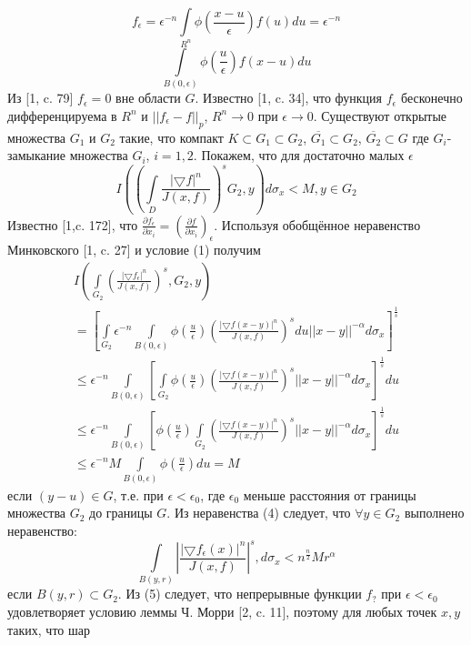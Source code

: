 $$
f_{\epsilon}=\epsilon^{-n}\int\limits_{R^n}\phi\left(\frac{x-u}{\epsilon}\right)f(u)du=\epsilon^{-n}$$
$$\int\limits_{B(0,\epsilon)}\phi\left(\frac{u}{\epsilon}\right)f(x-u)du
$$
Из [1, c. 79] $f_{\epsilon}=0$ вне области $G$. Известно [1, c. 34], что функция $f_{\epsilon}$ бесконечно дифференцируема в $R^n$ и $||f_{\epsilon}-f||_p$, $R^{n}\to 0$ при $\epsilon\to 0$. Существуют открытые множества $G_1$ и $G_2$ такие, что компакт $K\subset G_{1} \subset G_{2}$, $\overline{G_1}\subset G_{2}$, $\overline{G_2}\subset G$ где $G_i$- замыкание множества $G_i$, $i=1,2$.
 	Покажем, что для достаточно малых $\epsilon$
 	$$I\left(\left(
\int\limits_D\frac{|\bigtriangledown f|^{n}}{J(x,f)}
\right)^{s}G_{2},y\right) d\sigma_{x}<M, y\in G_2$$
Известно [1,c. 172], что $\frac{\partial f_\epsilon}{\partial x_i}=\left(\frac{\partial f}{\partial x_i}\right)_\epsilon$. Используя обобщённое неравенство Минковского [1, c. 27] и условие (1) получим
\begin{multline}
I\left(\int\limits_{G_2}\left(\frac{|\bigtriangledown f_{\epsilon}|^{n}}{J(x,f)}\right)^s, G_{2},y\right)\\
=\left[ \int\limits_{G_2}\epsilon^{-n}\int\limits_{B(0,\epsilon)}\phi\left(\frac{u}{\epsilon}\right)\left(\frac{|\bigtriangledown f(x-y)|^{n}}{J(x,f)}\right)^{s}
du||x-y||^{-\alpha}d\sigma_{x}\right]^{\frac{1}{s}}\\
\leq\epsilon^{-n}\int\limits_{B(0,\epsilon)}\left[\int\limits_{G_2}\phi\left(\frac{u}{\epsilon}\right)\left(\frac{|\bigtriangledown f(x-y)|^{n}}{J(x,f)}\right)^{s}||x-y||^{-\alpha}d\sigma_{x}\right]^{\frac{1}{s}}du
\\\leq\epsilon^{-n}\int\limits_{B(0,\epsilon)}\left[\phi\left(\frac{u}{\epsilon}\right)\int\limits_{G_2}\left(\frac{|\bigtriangledown f(x-y)|^{n}}{J(x,f)}\right)^{s}||x-y||^{-\alpha}d\sigma_{x}\right]^{\frac{1}{s}}du\\
\leq\epsilon^{-n}M\int\limits_{B(0,\epsilon)}\phi\left(\frac{u}{\epsilon}\right)du=M
\end{multline}
если $(y-u)\in G$, т.е. при $\epsilon<\epsilon_0$, где $\epsilon_0$ меньше расстояния от границы множества $G_2$ до границы $G$. Из неравенства (4) следует, что $\forall y\in G_2$ выполнено неравенство:
\begin{equation}
\int\limits_{B(y,r)}\left|\frac{|\bigtriangledown f_{\epsilon}(x)|^{n}}{J(x,f)}\right|^s, d\sigma_{x}<n^{\frac{n}{2}}Mr^\alpha
\end{equation}
если $B(y,r)\subset G_2$.
Из (5) следует, что непрерывные функции $f_?$ при $\epsilon<\epsilon_0$ удовлетворяет условию леммы Ч. Морри [2, c. 11], поэтому для любых точек $x, y$ таких, что шар
